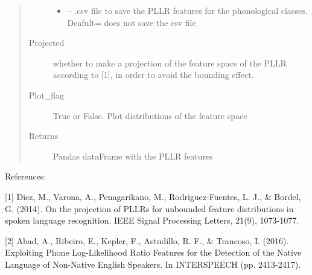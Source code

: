 \documentclass[letterpaper,10pt,english]{sphinxmanual}
\begin{document}
\begin{fulllineitems}
\begin{fulllineitems}
\begin{quote}
\begin{description}
\begin{itemize}
\item {} 
 -- .csv file  to save the PLLR features for the phonological classes. Deafult=\sphinxquotedblright{}\sphinxquotedblright{} does not save the csv file

\end{itemize}

\item[{Projected}] \leavevmode
whether to make a projection of the feature space of the PLLR according to {[}1{]}, in order to avoid the bounding effect.

\item[{Plot\_flag}] \leavevmode
True or False. Plot distributions of the feature space

\item[{Returns}] \leavevmode
Pandas dataFrame with the PLLR features

\end{description}\end{quote}

\begin{sphinxVerbatim}[commandchars=\\\{\}]
\PYG{p}{[}\PYG{p}{]}
\end{sphinxVerbatim}

References:

{[}1{]} Diez, M., Varona, A., Penagarikano, M., Rodriguez-Fuentes, L. J., \& Bordel, G. (2014). On the projection of PLLRs for unbounded feature distributions in spoken language recognition. IEEE Signal Processing Letters, 21(9), 1073-1077.

{[}2{]} Abad, A., Ribeiro, E., Kepler, F., Astudillo, R. F., \& Trancoso, I. (2016). Exploiting Phone Log-Likelihood Ratio Features for the Detection of the Native Language of Non-Native English Speakers. In INTERSPEECH (pp. 2413-2417).

\end{fulllineitems}



\end{fulllineitems}
\end{document}
